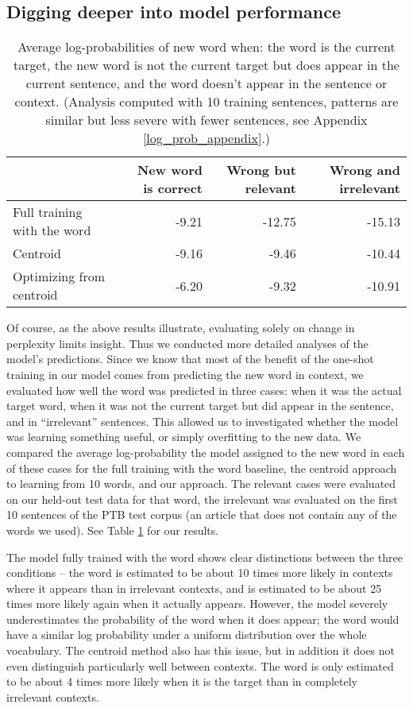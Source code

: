 \documentclass{article}
\begin{document}
\subsection{Digging deeper into model performance} \label{digging_deeper}
\begin{table}[ht]
\centering
\begin{tabular}{|l|rrr|}
  \hline
  & New word is correct & Wrong but relevant & Wrong and irrelevant \\ 
  \hline
  Full training with the word & -9.21 & -12.75 & -15.13 \\ 
  Centroid & -9.16 & -9.46 & -10.44 \\ 
  Optimizing from centroid & -6.20 & -9.32 & -10.91 \\ 
   \hline
\end{tabular}
\caption{Average log-probabilities of new word when: the word is the current target, the new word is not the current target but does appear in the current sentence, and the word doesn't appear in the sentence or context. (Analysis computed with 10 training sentences, patterns are similar but less severe with fewer sentences, see Appendix \ref{log_prob_appendix}.)} \label{word_prob_table} 
\end{table}
Of course, as the above results illustrate, evaluating solely on change in perplexity limits insight. Thus we conducted more detailed analyses of the model's predictions. Since we know that most of the benefit of the one-shot training in our model comes from predicting the new word in context, we evaluated how well the word was predicted in three cases: when it was the actual target word, when it was not the current target but did appear in the sentence, and in ``irrelevant'' sentences. This allowed us to investigated whether the model was learning something useful, or simply overfitting to the new data. We compared the average log-probability the model assigned to the new word in each of these cases for the full training with the word baseline, the centroid approach to learning from 10 words, and our approach. The relevant cases were evaluated on our held-out test data for that word, the irrelevant was evaluated on the first 10 sentences of the PTB test corpus (an article that does not contain any of the words we used). See Table \ref{word_prob_table} for our results. \par 
The model fully trained with the word shows clear distinctions between the three conditions -- the word is estimated to be about 10 times more likely in contexts where it appears than in irrelevant contexts, and is estimated to be about 25 times more likely again when it actually appears. However, the model severely underestimates the probability of the word when it does appear; the word would have a similar log probability under a uniform distribution over the whole vocabulary. The centroid method also has this issue, but in addition it does not even distinguish particularly well between contexts. The word is only estimated to be about 4 times more likely when it is the target than in completely irrelevant contexts. \par
\end{document}
